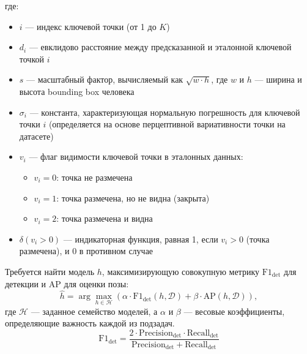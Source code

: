 \documentclass{article}
\begin{document}
где:
\begin{itemize}
    \item $i$ — индекс ключевой точки (от 1 до $K$)
    \item $d_i$ — евклидово расстояние между предсказанной и эталонной ключевой точкой $i$
    \item $s$ — масштабный фактор, вычисляемый как $\sqrt{w \cdot h}$, где $w$ и $h$ — ширина и высота bounding box человека
    \item $\sigma_i$ — константа, характеризующая нормальную погрешность для ключевой точки $i$ (определяется на основе перцептивной вариативности точки на датасете)
    \item $v_i$ — флаг видимости ключевой точки в эталонных данных:
    \begin{itemize}
        \item $v_i = 0$: точка не размечена
        \item $v_i = 1$: точка размечена, но не видна (закрыта)
        \item $v_i = 2$: точка размечена и видна
    \end{itemize}
    \item $\delta(v_i > 0)$ — индикаторная функция, равная 1, если $v_i > 0$ (точка размечена), и 0 в противном случае
\end{itemize}
Требуется найти модель $h$, максимизирующую совокупную метрику $\mathrm{F1}_{\mathrm{det}}$ для детекции и $\mathrm{AP}$ для оценки позы:
\[
\hat{h} = \arg \max_{h \in \mathcal{H}} \left( \alpha \cdot \mathrm{F1}_{\mathrm{det}}(h, \mathcal{D}) + \beta \cdot \mathrm{AP}(h, \mathcal{D}) \right),
\]
где $\mathcal{H}$ — заданное семейство моделей, а $\alpha$ и $\beta$ — весовые коэффициенты, определяющие важность каждой из подзадач.
\[
\mathrm{F1}_{\mathrm{det}} = \frac{2 \cdot \mathrm{Precision}_{\mathrm{det}} \cdot \mathrm{Recall}_{\mathrm{det}}}{\mathrm{Precision}_{\mathrm{det}} + \mathrm{Recall}_{\mathrm{det}}}
\]



\end{document}
